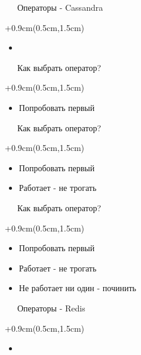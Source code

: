 \documentclass[xetex,18pt,aspectratio=43]{beamer}
\begin{document}
\begin{Large}
\begin{frame}{\ \ \ Операторы - Cassandra}
\begin{textblock*}{\framewidth+0.9cm}(0.5cm,1.5cm)
\begin{itemize}
  \item \href{https://github.com/alexclear/vagrant-k8s-freehck-cassandra-lab}{\color{linkcolor}{github.com/alexclear/vagrant-k8s-freehck-cassandra-lab}}
\end{itemize}
\end{textblock*}
\end{frame}

\begin{frame}{\ \ \ Как выбрать оператор?}
\begin{textblock*}{\framewidth+0.9cm}(0.5cm,1.5cm)
\begin{itemize}
  \item Попробовать первый
\end{itemize}
\end{textblock*}
\end{frame}

\begin{frame}{\ \ \ Как выбрать оператор?}
\begin{textblock*}{\framewidth+0.9cm}(0.5cm,1.5cm)
\begin{itemize}
  \item Попробовать первый
  \item Работает - не трогать
\end{itemize}
\end{textblock*}
\end{frame}

\begin{frame}{\ \ \ Как выбрать оператор?}
\begin{textblock*}{\framewidth+0.9cm}(0.5cm,1.5cm)
\begin{itemize}
  \item Попробовать первый
  \item Работает - не трогать
  \item Не работает ни один - починить
\end{itemize}
\end{textblock*}
\end{frame}

\begin{frame}{\ \ \ Операторы - Redis}
\begin{textblock*}{\framewidth+0.9cm}(0.5cm,1.5cm)
\begin{itemize}
  \item \href{https://github.com/alexclear/vagrant-k8s-freehck-redis-lab}{\color{linkcolor}{github.com/alexclear/vagrant-k8s-freehck-redis-lab}}
\end{itemize}
\end{textblock*}
\end{frame}


\end{Large}
\end{document}
